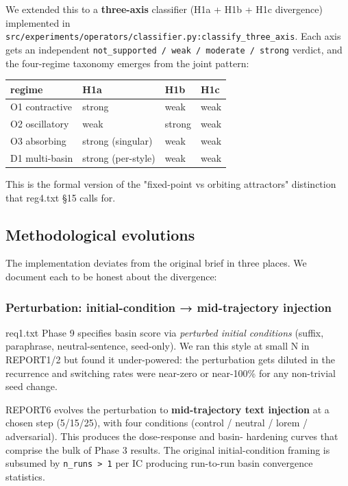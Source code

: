 \documentclass{article}
\theoremstyle{plain}
\theoremstyle{definition}
\begin{document}
We extended this to a \textbf{three-axis} classifier (H1a + H1b + H1c
divergence) implemented in
\texttt{src/experiments/operators/classifier.py:classify\_three\_axis}. Each
axis gets an independent \texttt{not\_supported / weak / moderate / strong}
verdict, and the four-regime taxonomy emerges from the joint pattern:

\begin{table}[h!]
\centering
\small
\begin{tabular}{llll}
\toprule
regime & H1a & H1b & H1c \\
\midrule
O1 contractive & strong & weak & weak \\
O2 oscillatory & weak & strong & weak \\
O3 absorbing & strong (singular) & weak & weak \\
D1 multi-basin & strong (per-style) & weak & weak \\
\bottomrule
\end{tabular}
\end{table}

This is the formal version of the "fixed-point vs orbiting attractors"
distinction that reg4.txt §15 calls for.

\subsection{Methodological evolutions}

The implementation deviates from the original brief in three places.
We document each to be honest about the divergence:

\subsubsection{Perturbation: initial-condition → mid-trajectory injection}

req1.txt Phase 9 specifies basin score via \textit{perturbed initial
conditions} (suffix, paraphrase, neutral-sentence, seed-only). We ran
this style at small N in REPORT1/2 but found it under-powered: the
perturbation gets diluted in the recurrence and switching rates were
near-zero or near-100\% for any non-trivial seed change.

REPORT6 evolves the perturbation to \textbf{mid-trajectory text injection}
at a chosen step (5/15/25), with four conditions (control / neutral /
lorem / adversarial). This produces the dose-response and basin-
hardening curves that comprise the bulk of Phase 3 results. The
original initial-condition framing is subsumed by \texttt{n\_runs > 1} per IC
producing run-to-run basin convergence statistics.
\end{document}
